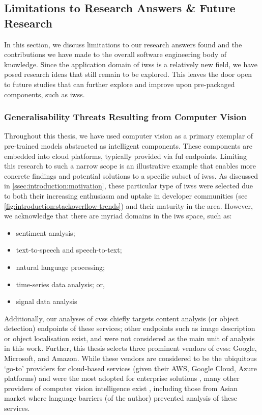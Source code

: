 \subsection{Limitations to Research Answers \& Future Research}

In this section, we discuss limitations to our research answers found and the contributions we have made to the overall software engineering body of knowledge. Since the application domain of \glspl{iws} is a relatively new field, we have posed research ideas that still remain to be explored. This leaves the door open to future studies that can further explore and improve upon pre-packaged  components, such as \glspl{iws}.

\subsubsection{Generalisability Threats Resulting from Computer Vision}

Throughout this thesis, we have used computer vision as a primary exemplar of pre-trained  models abstracted as intelligent  components. These components are embedded into cloud platforms, typically provided via ful  endpoints. Limiting this research to such a narrow scope is an illustrative example that enables more concrete findings and potential solutions to a specific subset of \glspl{iws}. As discussed in \cref{ssec:introduction:motivation}, these particular type of \glspl{iws} were selected due to both their increasing enthusiasm and uptake in developer communities (see \cref{fig:introduction:stackoverflow-trends}) and their maturity in the area. However, we acknowledge that there are myriad domains in the \gls{iws} space, such as:

\begin{itemize}
	\item sentiment analysis;
	\item text-to-speech and speech-to-text;
	\item natural language processing;
	\item time-series data analysis; or,
	\item signal data analysis
\end{itemize}

Additionally, our analyses of \glspl{cvs} chiefly targets content analysis (or object detection) endpoints of these services; other endpoints such as image description or object localisation exist, and were not considered as the main unit of analysis in this work. Further, this thesis selects three prominent vendors of \glspl{cvs}: Google, Microsoft, and Amazon. While these vendors are considered to be the ubiquitous `go-to' providers for cloud-based services (given their AWS, Google Cloud, Azure platforms) and were the most adopted for enterprise solutions \citep{RightScaleInc:2018kJ}, many other providers of computer vision intelligence exist , including those from Asian market  where language barriers (of the author) prevented analysis of these services.

